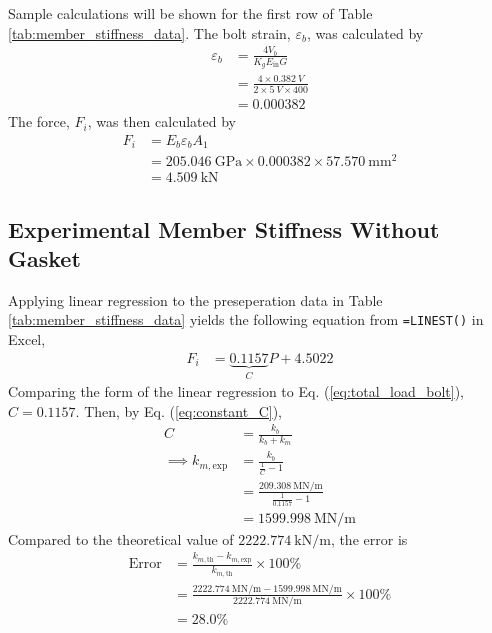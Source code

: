 Sample calculations will be shown for the first row of Table \ref{tab:member_stiffness_data}. The bolt strain, $\varepsilon_b$, was calculated by
\begin{align*}
    \varepsilon_b &= \frac{4 V_b}{K_g E_{\text{in}} G} \\
    &= \frac{4 \times \qty{0.382}{V}}{2 \times \qty{5}{V} \times 400} \\
    &= \qty{0.000382}{}
\end{align*}
The force, $F_i$, was then calculated by
\begin{align*}
    F_i &= E_b \varepsilon_b A_1 \\
    &= \qty{205.046}{\giga\pascal} \times \qty{0.000382} \times \qty{57.570}{\milli\meter\squared} \\
    &= \boxed{\qty{4.509}{\kilo\newton}}
\end{align*}

\subsection{Experimental Member Stiffness Without Gasket}
Applying linear regression to the preseperation data in Table \ref{tab:member_stiffness_data} yields the following equation from \texttt{=LINEST()} in Excel,
\begin{align*}
    F_i &= \underbrace{0.1157}_{C} P + 4.5022
\end{align*}
Comparing the form of the linear regression to Eq. (\ref{eq:total_load_bolt}), $C = 0.1157$. Then, by Eq. (\ref{eq:constant_C}), 
\begin{align*}
    C &= \frac{k_b}{k_b + k_m} \\
    \implies k_{m, \text{exp}} &= \frac{k_b}{\frac{1}{C} - 1} \\
    &= \frac{\qty{209.308}{\mega\newton\per\meter}}{\frac{1}{0.1157} - 1} \\
    &= \boxed{\qty{1599.998}{\mega\newton\per\meter}}
\end{align*}
Compared to the theoretical value of $\qty{2222.774}{\kilo\newton\per\meter}$, the error is
\begin{align*}
    \text{Error} &= \frac{k_{m, \text{th}} - k_{m, \text{exp}}}{k_{m, \text{th}}} \times 100\% \\
    &= \frac{\qty{2222.774}{\mega\newton\per\meter} - \qty{1599.998}{\mega\newton\per\meter}}{\qty{2222.774}{\mega\newton\per\meter}} \times 100\% \\
    &= \boxed{28.0\%}
\end{align*}


